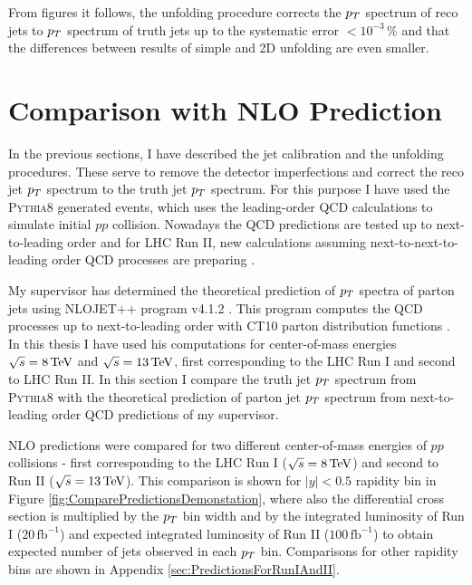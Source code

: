 From figures it follows, the unfolding procedure corrects the
$p_{T}$ spectrum of reco jets to $p_{T}$ spectrum of truth jets up to the systematic
error $<10^{-3}\,\%$ and that the differences between results of simple and 2D
unfolding are even smaller.

\section{Comparison with NLO Prediction}
\label{sec:ComaprisonWithNLOPrediction}

In the previous sections, I have described the jet calibration and the unfolding
procedures. These serve to remove the detector imperfections and correct the
reco jet $p_{T}$ spectrum to the truth jet $p_{T}$ spectrum. For this purpose I
have used the \textsc{Pythia8} generated events, which uses
the leading-order QCD calculations to simulate initial $pp$ collision.
Nowadays the QCD predictions are tested up to next-to-leading order and for
LHC Run II, new calculations assuming next-to-next-to-leading order QCD
processes are preparing \cite{NNLO1,NNLO2}.

My supervisor has determined the theoretical prediction of $p_{T}$ spectra of
parton jets using \textsc{NLOJET++} program v4.1.2 \cite{NLOJetProgram}. This
program computes the QCD processes up to next-to-leading order with CT10
parton distribution functions \cite{CT10PDF, Annecy}. In this thesis I have used
his computations for center-of-mass energies $\sqrt{s}=8\,\text{TeV}$ and
$\sqrt{s}=13\,\text{TeV}$, first corresponding to the LHC Run I and second to LHC Run
II. In this section I compare the truth jet $p_{T}$ spectrum from \textsc{Pythia8}
with the theoretical prediction of parton jet $p_{T}$ spectrum from
next-to-leading order QCD predictions of my supervisor.

NLO predictions were compared for two different center-of-mass energies of $pp$
collisions - first corresponding to the LHC Run I ($\sqrt{s}=8\,\text{TeV}$) and second
to Run II ($\sqrt{s} = 13\,\text{TeV}$).  This comparison is shown for $|y|<0.5$
rapidity bin in Figure \ref{fig:ComparePredictionsDemonstation}, where also the
differential cross section is multiplied by the $p_{T}$ bin width and by
the integrated luminosity of Run I ($20\,\text{fb}^{-1}$) and expected
integrated luminosity of Run II ($100\,\text{fb}^{-1}$) to obtain expected number
of jets observed in each $p_{T}$ bin. Comparisons for other rapidity bins are
shown in Appendix \ref{sec:PredictionsForRunIAndII}.

